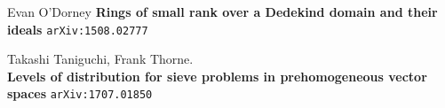 \documentclass[12pt]{article}
\begin{document}
\begin{thebibliography}{}

\item Evan O'Dorney
\textbf{Rings of small rank over a Dedekind domain and their ideals} \texttt{arXiv:1508.02777}

\item Takashi Taniguchi, Frank Thorne. \\ 
\textbf{Levels of distribution for sieve problems in prehomogeneous vector spaces} \texttt{arXiv:1707.01850}



\end{thebibliography}
\end{document}
